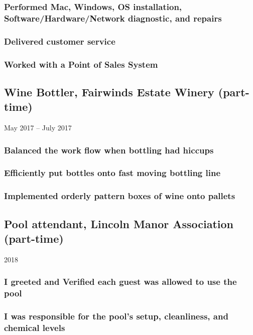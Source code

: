 \documentclass{article}
\begin{document}
        \vspace{-2mm}
        \subsubsection{Performed Mac, Windows, OS installation, Software/Hardware/Network diagnostic, and repairs}
    	\subsubsection{Delivered customer service}
    	\subsubsection{Worked with a Point of Sales System}
	\subsection{Wine Bottler, Fairwinds Estate Winery (part-time)} May 2017 – July 2017
		\vspace{-2mm}
		\subsubsection{Balanced the work flow when bottling had hiccups}
		\subsubsection{Efficiently put bottles onto fast moving bottling line}
		\subsubsection{Implemented orderly pattern boxes of wine onto pallets}

	\subsection{Pool attendant, Lincoln Manor Association (part-time)} 2018
		\vspace{-2mm}

		\subsubsection{I greeted and Verified each guest was allowed to use the pool}
		\subsubsection{I was responsible for the pool's setup, cleanliness, and chemical levels}
\end{document}
